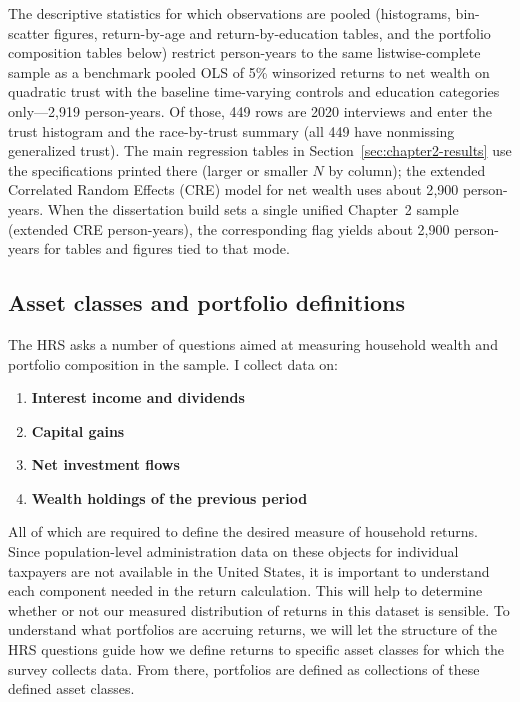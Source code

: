 \par The descriptive statistics for which observations are pooled (histograms, bin-scatter figures, return-by-age and return-by-education tables, and the portfolio composition tables below) restrict person-years to the same listwise-complete sample as a benchmark pooled OLS of 5\% winsorized returns to net wealth on quadratic trust with the baseline time-varying controls and education categories only---2{,}919 person-years. Of those, 449 rows are 2020 interviews and enter the trust histogram and the race-by-trust summary (all 449 have nonmissing generalized trust). The main regression tables in Section~\ref{sec:chapter2-results} use the specifications printed there (larger or smaller $N$ by column); the extended Correlated Random Effects (CRE) model for net wealth uses about 2{,}900 person-years. When the dissertation build sets a single unified Chapter~2 sample (extended CRE person-years), the corresponding flag yields about 2{,}900 person-years for tables and figures tied to that mode.

\subsection{Asset classes and portfolio definitions}

\par The HRS asks a number of questions aimed at measuring household wealth and portfolio composition in the sample. I collect data on:
\begin{enumerate}
  \item \textbf{Interest income and dividends}
  \item \textbf{Capital gains}
  \item \textbf{Net investment flows}
  \item \textbf{Wealth holdings of the previous period}
\end{enumerate}
All of which are required to define the desired measure of household returns. Since population-level administration data on these objects for individual taxpayers are not available in the United States, it is important to understand each component needed in the return calculation. This will help to determine whether or not our measured distribution of returns in this dataset is sensible. To understand what portfolios are accruing returns, we will let the structure of the HRS questions guide how we define returns to specific asset classes for which the survey collects data. From there, portfolios are defined as collections of these defined asset classes.


